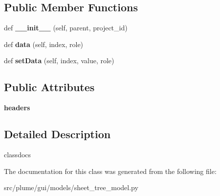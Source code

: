 \subsection*{Public Member Functions}
\begin{DoxyCompactItemize}
\item 
def {\bfseries \+\_\+\+\_\+init\+\_\+\+\_\+} (self, parent, project\+\_\+id)\hypertarget{classplume-creator_1_1src_1_1plume_1_1gui_1_1models_1_1sheet__tree__model_1_1_sheet_tree_model_a9270fb079b7857642308aaa117953bac}{}\label{classplume-creator_1_1src_1_1plume_1_1gui_1_1models_1_1sheet__tree__model_1_1_sheet_tree_model_a9270fb079b7857642308aaa117953bac}

\item 
def {\bfseries data} (self, index, role)\hypertarget{classplume-creator_1_1src_1_1plume_1_1gui_1_1models_1_1sheet__tree__model_1_1_sheet_tree_model_a9432ffd684ea3733121af711a6f447e5}{}\label{classplume-creator_1_1src_1_1plume_1_1gui_1_1models_1_1sheet__tree__model_1_1_sheet_tree_model_a9432ffd684ea3733121af711a6f447e5}

\item 
def {\bfseries set\+Data} (self, index, value, role)\hypertarget{classplume-creator_1_1src_1_1plume_1_1gui_1_1models_1_1sheet__tree__model_1_1_sheet_tree_model_af762b3b28b16ecfc9d7df99c9900a1dd}{}\label{classplume-creator_1_1src_1_1plume_1_1gui_1_1models_1_1sheet__tree__model_1_1_sheet_tree_model_af762b3b28b16ecfc9d7df99c9900a1dd}

\end{DoxyCompactItemize}
\subsection*{Public Attributes}
\begin{DoxyCompactItemize}
\item 
{\bfseries headers}\hypertarget{classplume-creator_1_1src_1_1plume_1_1gui_1_1models_1_1sheet__tree__model_1_1_sheet_tree_model_a03e31e8a13225c6f3d39db55602cc656}{}\label{classplume-creator_1_1src_1_1plume_1_1gui_1_1models_1_1sheet__tree__model_1_1_sheet_tree_model_a03e31e8a13225c6f3d39db55602cc656}

\end{DoxyCompactItemize}


\subsection{Detailed Description}
classdocs 

The documentation for this class was generated from the following file\+:\begin{DoxyCompactItemize}
\item 
src/plume/gui/models/sheet\+\_\+tree\+\_\+model.\+py\end{DoxyCompactItemize}
